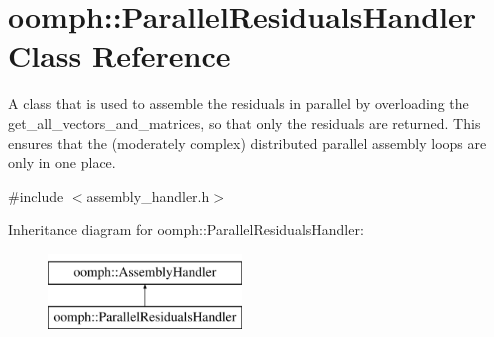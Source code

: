 \hypertarget{classoomph_1_1ParallelResidualsHandler}{}\section{oomph\+:\+:Parallel\+Residuals\+Handler Class Reference}
\label{classoomph_1_1ParallelResidualsHandler}


A class that is used to assemble the residuals in parallel by overloading the get\+\_\+all\+\_\+vectors\+\_\+and\+\_\+matrices, so that only the residuals are returned. This ensures that the (moderately complex) distributed parallel assembly loops are only in one place.  




{\ttfamily \#include $<$assembly\+\_\+handler.\+h$>$}

Inheritance diagram for oomph\+:\+:Parallel\+Residuals\+Handler\+:\begin{figure}[H]
\begin{center}
\leavevmode
\includegraphics[height=2.000000cm]{classoomph_1_1ParallelResidualsHandler}
\end{center}
\end{figure}
